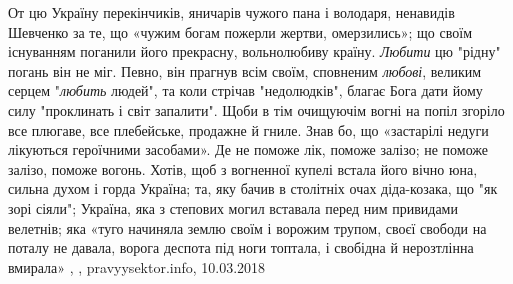 От цю Україну перекінчиків, яничарів чужого пана і володаря, ненавидів Шевченко
за те, що «чужим богам пожерли жертви, омерзились»; що своїм існуванням
поганили його прекрасну, вольнолюбиву країну. \emph{Любити} цю "рідну" погань
він не міг. Певно, він прагнув всім своїм, сповненим \emph{любові}, великим
серцем "\emph{любить} людей", та коли стрічав "недолюдків", благає Бога дати
йому силу "проклинать і світ запалити". Щоби в тім очищуючім вогні на попіл
згоріло все плюгаве, все плебейське, продажне й гниле. Знав бо, що «застарілі
недуги лікуються героїчними засобами». Де не поможе лік, поможе залізо; не
поможе залізо, поможе вогонь. Хотів, щоб з вогненної купелі встала його вічно
юна, сильна духом і горда Україна; та, яку бачив в столітніх очах діда-козака,
що "як зорі сіяли"; Україна, яка з степових могил вставала перед ним привидами
велетнів; яка «туго начиняла землю своїм і ворожим трупом, своєї свободи на
поталу не давала, ворога деспота під ноги топтала, і свобідна й нерозтлінна
вмирала»
, , pravyysektor.info, 10.03.2018
